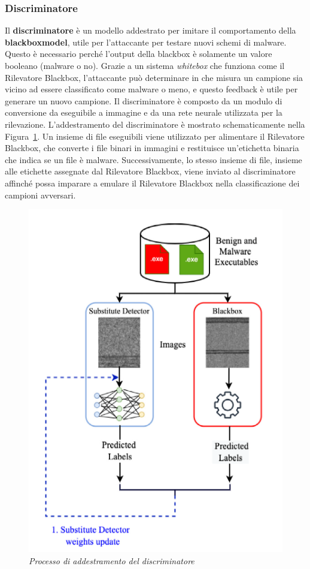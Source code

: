 \subsubsection{Discriminatore}
Il \textbf{discriminatore} è un modello addestrato per imitare il comportamento della \textbf{\gls{blackboxmodel}}, utile per l'attaccante per testare nuovi schemi di malware. Questo è necessario perché l'output della blackbox è solamente un valore booleano (malware o no). Grazie a un sistema \textit{whitebox} che funziona come il Rilevatore Blackbox, l'attaccante può determinare in che misura un campione sia vicino ad essere classificato come malware o meno, e questo feedback è utile per generare un nuovo campione.
Il discriminatore è composto da un modulo di conversione da eseguibile a immagine e da una rete neurale utilizzata per la rilevazione. L'addestramento del discriminatore è mostrato schematicamente nella Figura~\ref{fig:discriminator_train}. Un insieme di file eseguibili viene utilizzato per alimentare il Rilevatore Blackbox, che converte i file binari in immagini e restituisce un'etichetta binaria che indica se un file è malware. Successivamente, lo stesso insieme di file, insieme alle etichette assegnate dal Rilevatore Blackbox, viene inviato al discriminatore affinché possa imparare a emulare il Rilevatore Blackbox nella classificazione dei campioni avversari.

\begin{figure}[ht]
    \centering
        \centering
        \includegraphics[width=0.6\linewidth]{images/discriminator_train.png}
        \caption{\emph{Processo di addestramento del discriminatore}}
        \label{fig:discriminator_train}
\end{figure}

